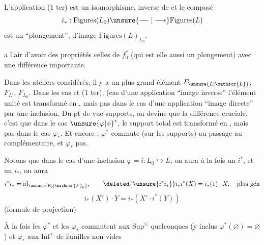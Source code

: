 L'application (1 ter) est un isomorphisme, inverse de
et le composé
\[
i_*:\mathrm{Figures}(L_0)\unsure{\relbar\joinrel\relbar|\longrightarrow}\mathrm{Figures}(L)
\]
est un ``plongement'', d'image $\mathrm{Figures}(L)_{L_0}$.

 a l'air d'avoir des propriétés   celles de $f_0^*$ (qui est elle aussi un plongement) avec une différence importante.

Dans les ateliers considérés, il y a un plus grand élément $F_{\unsure{L|\mathscr{L}}}$, $F_{L'}$, $F_{L_0}$. Dans les cas    et (1 ter),  (cas d'une application ``image inverse'' l'élément unité est transformé en , mais pas  dans le cas d'une application ``image directe'' par une inclusion. Du pt de vue supports, on devine que la différence cruciale, c'est que dans le cas ${\unsure{\varphi|\phi}}^*$, le support  total est transformé en , mais pas dans le cas $\varphi_*$. Et encore : $\varphi^*$ commute (sur les supports) au passage au complémentaire, et $\varphi_*$ pas.

Notons que dans le cas d'une inclusion $\varphi=i:L_0\hookrightarrow L$,  on aura à la fois un $i^*$, et un $i_*$, on aura
\[
i^*i_*=\mathrm{id}_{\unsure{F_0|\mathscr{F}_0}},\qquad\deleted{\unsure{i^*i_*}}i_*i^*(X)=i_*(1)\cdot X,\quad\text{plus gén}
\]
\[
i_*(X')\cdot Y=i_*(X'\cdot i^*(Y))
\]
(formule de projection)

À la fois les $\varphi^*$ et les $\varphi_*$ commutent aux $\mathrm{Sup}^{\leq}$ quelconques (y inclus $\varphi^*(\varnothing)=\varnothing$) et $\varphi_*$ aux $\mathrm{Inf}^{\leq}$ de familles non vides
